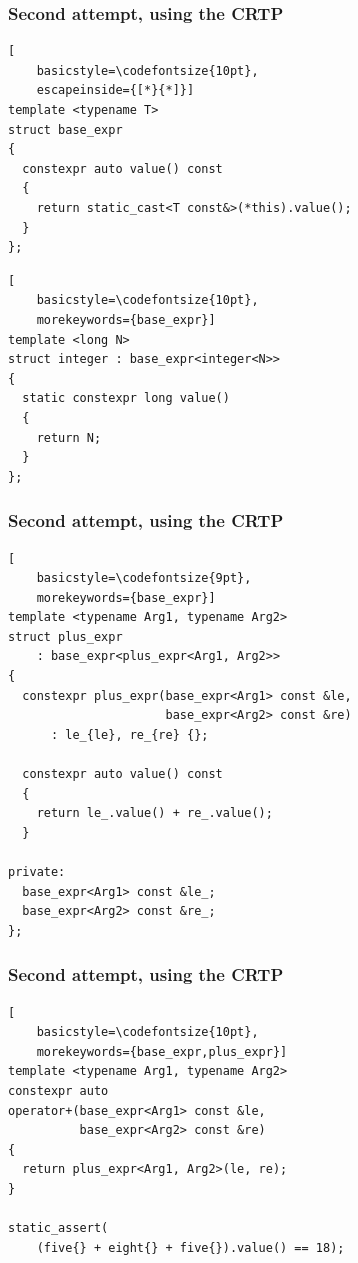 \documentclass[14pt]{beamer}
\begin{document}
\begin{frame}[fragile]
  \frametitle{Second attempt, using the CRTP}

  \begin{lstlisting}[
    basicstyle=\codefontsize{10pt},
    escapeinside={[*}{*]}]
template <typename T>
struct base_expr
{
  constexpr auto value() const
  {
    return static_cast<T const&>(*this).value();
  }
};
  \end{lstlisting}

  \begin{lstlisting}[
    basicstyle=\codefontsize{10pt},
    morekeywords={base_expr}]
template <long N>
struct integer : base_expr<integer<N>>
{
  static constexpr long value()
  {
    return N;
  }
};
  \end{lstlisting}

\end{frame}

\begin{frame}[fragile]
  \frametitle{Second attempt, using the CRTP}

  \begin{lstlisting}[
    basicstyle=\codefontsize{9pt},
    morekeywords={base_expr}]
template <typename Arg1, typename Arg2>
struct plus_expr
    : base_expr<plus_expr<Arg1, Arg2>>
{
  constexpr plus_expr(base_expr<Arg1> const &le,
                      base_expr<Arg2> const &re)
      : le_{le}, re_{re} {};

  constexpr auto value() const
  {
    return le_.value() + re_.value();
  }

private:
  base_expr<Arg1> const &le_;
  base_expr<Arg2> const &re_;
};
  \end{lstlisting}

\end{frame}

\begin{frame}[fragile]
  \frametitle{Second attempt, using the CRTP}

  \begin{lstlisting}[
    basicstyle=\codefontsize{10pt},
    morekeywords={base_expr,plus_expr}]
template <typename Arg1, typename Arg2>
constexpr auto
operator+(base_expr<Arg1> const &le,
          base_expr<Arg2> const &re)
{
  return plus_expr<Arg1, Arg2>(le, re);
}

static_assert(
    (five{} + eight{} + five{}).value() == 18);
  \end{lstlisting}


\end{frame}
\end{document}
